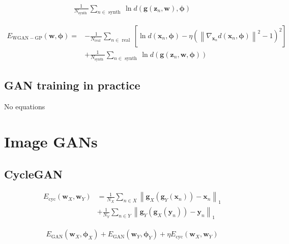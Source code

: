 \documentclass{article}
\begin{document}
\begin{align*}
\frac{1}{N_{\text{synth }}} \sum_{n \in \text{ synth }} \ln d\left(\mathbf{g}\left(\mathbf{z}_{n}, \mathbf{w}\right), \boldsymbol{\phi}\right) 
\tag{17.10}
\end{align*}

\begin{align*}
E_{\mathrm{WGAN}-\mathrm{GP}}(\mathbf{w}, \boldsymbol{\phi})= & -\frac{1}{N_{\text{real }}} \sum_{n \in \text{ real }}\left[
\ln d\left(\mathbf{x}_{n}, \boldsymbol{\phi}\right)-\eta\left(\left\|\nabla_{\mathbf{x}_{n}} d\left(\mathbf{x}_{n}, \boldsymbol{\phi}\right)\right\|^{2}-1\right)^{2}\right]
\\
& +\frac{1}{N_{\text{synth }}} \sum_{n \in \text{ synth }} \ln d\left(\mathbf{g}\left(\mathbf{z}_{n}, \mathbf{w}, \boldsymbol{\phi}\right)\right)
\tag{17.11}
\end{align*}

\subsection{GAN training in practice}
No equations

\section{Image GANs}

\subsection{CycleGAN}

\begin{align*}
E_{\mathrm{cyc}}\left(\mathbf{w}_{X}, \mathbf{w}_{Y}\right) & =\frac{1}{N_{X}} \sum_{n \in X}\left\|\mathbf{g}_{X}\left(\mathbf{g}_{Y}\left(\mathbf{x}_{n}\right)\right)-\mathbf{x}_{n}\right\|_{1} \\
& +\frac{1}{N_{Y}} \sum_{n \in Y}\left\|\mathbf{g}_{Y}\left(\mathbf{g}_{X}\left(\mathbf{y}_{n}\right)\right)-\mathbf{y}_{n}\right\|_{1}
\tag{17.12}
\end{align*}

\begin{align*}
E_{\mathrm{GAN}}\left(\mathbf{w}_{X}, \boldsymbol{\phi}_{X}\right)+E_{\mathrm{GAN}}\left(\mathbf{w}_{Y}, \boldsymbol{\phi}_{Y}\right)+\eta E_{\mathrm{cyc}}\left(\mathbf{w}_{X}, \mathbf{w}_{Y}\right) 
\tag{17.13}
\end{align*}
\end{document}

